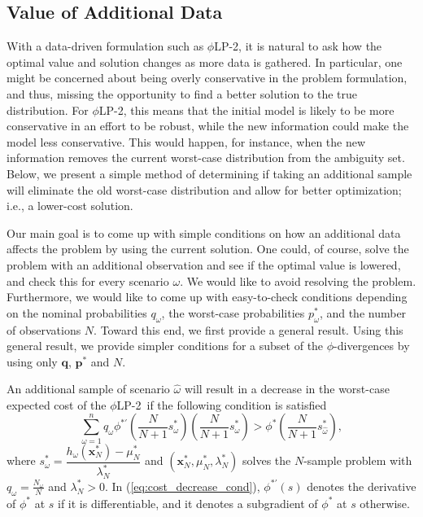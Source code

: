 \documentclass[opre,nonblindrev]{informs3} %
\newcommand{\x}{\mathbf{x}}
\newcommand{\q}{\mathbf{q}}
\newcommand{\p}{\mathbf{p}}
\newcommand{\plp}{$\phi$LP-2}
\begin{document}
\subsection{Value of Additional Data} \label{ssec:value}

With a data-driven formulation such as \plp, it is natural to ask how the optimal value and solution changes as more data is gathered.
In particular, %
one might be concerned about being overly conservative in the problem formulation, and thus, missing the opportunity to find a better solution to the true distribution.
For \plp, this means that the initial model is likely to be more conservative in an effort to be robust, while the new information could make the model less conservative.
This would happen, for instance, when the new information removes the current worst-case distribution from the ambiguity set.  
Below, we present a simple method of determining if taking an additional sample will eliminate the old worst-case distribution and allow for better optimization; i.e., a lower-cost solution.

Our main goal is to come up with simple conditions on how an additional data affects the problem by using the current solution. 
One could, of course, solve the problem with an additional observation and see if the optimal value is lowered, and check this for every scenario $\omega$. 
We would like to avoid resolving the problem. 
Furthermore, we would like to come up with easy-to-check conditions depending on the nominal probabilities $q_\omega$, the worst-case probabilities $p_\omega^*$, and the number of observations $N$. 
Toward this end, we first provide a general result. 
Using this general result, we provide simpler conditions for a subset of the $\phi$-divergences by using only $\q$, $\p^*$ and $N$. 

\begin{proposition}
	\label{prop:value}
	An additional sample of scenario $\hat{\omega}$ will result in a decrease in the worst-case expected cost of the \plp\ if the following condition is satisfied
	\begin{equation} \label{eq:cost_decrease_cond}
		\sum_{\omega=1}^n q_\omega \phi^{*\prime}\left(\frac{N}{N+1}s^*_\omega\right) \left(\frac{N}{N+1}s^*_\omega\right) > \phi^*\left(\frac{N}{N+1}s^*_{\hat{\omega}}\right),
	\end{equation}
	where $s^*_\omega = \dfrac{h_\omega(\x^*_N) - \mu^*_N}{\lambda^*_N}$ and $(\x^*_N,\mu^*_N,\lambda^*_N)$ solves the $N$-sample problem with $q_\omega = \tfrac{N_\omega}{N}$ and $\lambda^*_N>0$.
In (\ref{eq:cost_decrease_cond}), $\phi^{*\prime}(s)$ denotes the derivative of $\phi^{*}$ at $s$ if it is differentiable, and it denotes a subgradient of $\phi^{*}$ at $s$ otherwise. 
\end{proposition}
\end{document}
